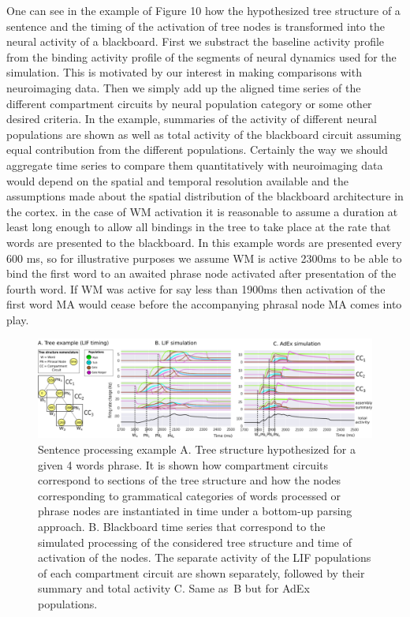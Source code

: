 \documentclass[10pt]{article}
\begin{document}
One can see in the example of Figure 10 how the hypothesized tree
structure of a sentence and the timing of the activation of tree nodes
is transformed into the neural activity of a blackboard. First we
substract the baseline activity profile from the binding activity
profile of the segments of neural dynamics used for the simulation.
This is motivated by our interest in making comparisons with
neuroimaging data. Then we simply add up the aligned time series of
the different compartment circuits by neural population category or
some other desired criteria. In the example, summaries of the activity
of different neural populations are shown as well as total activity of
the blackboard circuit assuming equal contribution from the different
populations. Certainly the way we should aggregate time series to
compare them quantitatively with neuroimaging data would depend on the
spatial and temporal resolution available and the assumptions made
about the spatial distribution of the blackboard architecture in the
cortex. in the case of WM activation it is reasonable to assume a
duration at least long enough to allow all bindings in the tree to
take place at the rate that words are presented to the blackboard. In
this example words are presented every 600 ms, so for illustrative
purposes we assume WM is active 2300ms to be able to bind the first
word to an awaited phrase node activated after presentation of the
fourth word. If WM was active for say less than 1900ms then activation
of the first word MA would cease before the accompanying phrasal node
MA comes into play.

\begin{figure}[h!]
  \begin{center}
    \includegraphics[width=1.00\columnwidth]{figures/compartments_tree_example/compartments_tree_example}
    \caption{{Sentence processing example {\label{679921}} A. Tree
        structure hypothesized for a given 4 words phrase. It is shown
        how compartment circuits correspond to sections of the tree
        structure and how the nodes corresponding to grammatical
        categories of words processed or phrase nodes are instantiated
        in time under a bottom-up parsing approach. B. Blackboard time
        series that correspond to the simulated processing of the
        considered tree structure and time of activation of the nodes.
        The separate activity of the LIF populations of each
        compartment circuit are shown separately, followed by their
        summary and total activity C. Same as~B but for AdEx
        populations. {\label{679921}}%
      }}
  \end{center}
\end{figure}
\end{document}
